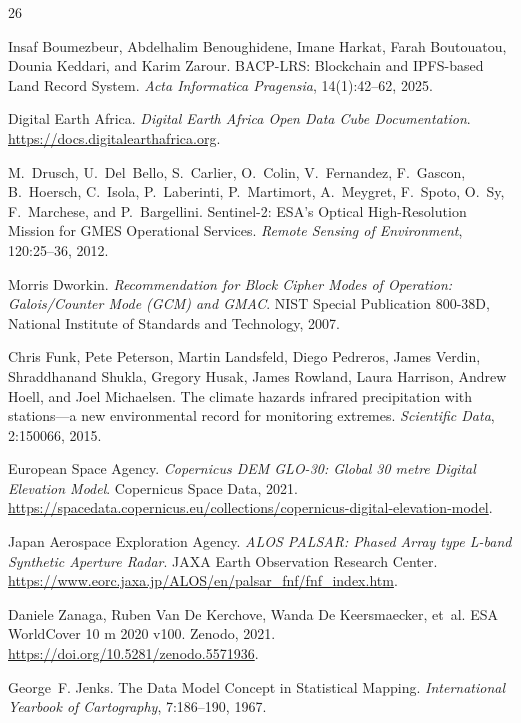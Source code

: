 \documentclass[10pt,a4paper,twocolumn]{article}
\begin{document}
\begin{thebibliography}{26}

Insaf Boumezbeur, Abdelhalim Benoughidene, Imane Harkat, Farah Boutouatou,
  Dounia Keddari, and Karim Zarour.
\newblock BACP-LRS: Blockchain and IPFS-based Land Record System.
\newblock \emph{Acta Informatica Pragensia}, 14(1):42--62, 2025.

Digital Earth Africa.
\newblock \emph{Digital Earth Africa Open Data Cube Documentation}.
\newblock \url{https://docs.digitalearthafrica.org}.

M.~Drusch, U.~Del~Bello, S.~Carlier, O.~Colin, V.~Fernandez, F.~Gascon,
  B.~Hoersch, C.~Isola, P.~Laberinti, P.~Martimort, A.~Meygret, F.~Spoto,
  O.~Sy, F.~Marchese, and P.~Bargellini.
\newblock Sentinel-2: ESA's Optical High-Resolution Mission for GMES Operational Services.
\newblock \emph{Remote Sensing of Environment}, 120:25--36, 2012.

Morris Dworkin.
\newblock \emph{Recommendation for Block Cipher Modes of Operation: Galois/Counter Mode (GCM) and GMAC}.
\newblock NIST Special Publication 800-38D, National Institute of Standards and Technology, 2007.

Chris Funk, Pete Peterson, Martin Landsfeld, Diego Pedreros, James Verdin,
  Shraddhanand Shukla, Gregory Husak, James Rowland, Laura Harrison, Andrew Hoell,
  and Joel Michaelsen.
\newblock The climate hazards infrared precipitation with stations---a new environmental record for monitoring extremes.
\newblock \emph{Scientific Data}, 2:150066, 2015.

European Space Agency.
\newblock \emph{Copernicus DEM GLO-30: Global 30 metre Digital Elevation Model}.
\newblock Copernicus Space Data, 2021.
\newblock \url{https://spacedata.copernicus.eu/collections/copernicus-digital-elevation-model}.

Japan Aerospace Exploration Agency.
\newblock \emph{ALOS PALSAR: Phased Array type L-band Synthetic Aperture Radar}.
\newblock JAXA Earth Observation Research Center.
\newblock \url{https://www.eorc.jaxa.jp/ALOS/en/palsar_fnf/fnf_index.htm}.

Daniele Zanaga, Ruben Van De Kerchove, Wanda De Keersmaecker, et~al.
\newblock ESA WorldCover 10 m 2020 v100.
\newblock Zenodo, 2021.
\newblock \url{https://doi.org/10.5281/zenodo.5571936}.

George~F. Jenks.
\newblock The Data Model Concept in Statistical Mapping.
\newblock \emph{International Yearbook of Cartography}, 7:186--190, 1967.


\end{thebibliography}
\end{document}
